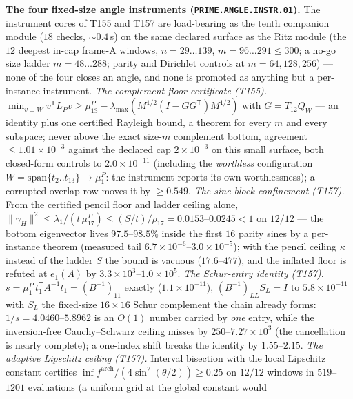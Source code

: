 \par\smallskip\noindent\textbf{The four fixed-size angle instruments
(\texttt{PRIME.ANGLE.INSTR.01}).}
The instrument cores of T155 and T157 are load-bearing as the tenth
companion module ($18$ checks, ${\sim}0.4$\,s) on the same declared
surface as the Ritz module (the $12$ deepest in-cap frame-A windows,
$n=29\ldots139$, $m=96\ldots291\le300$; a no-go size ladder
$m=48\ldots288$; parity and Dirichlet controls at $m=64,128,256$) ---
none of the four closes an angle, and none is promoted as anything but a
per-instance instrument.
\emph{The complement-floor certificate (T155).}
$\min_{v\perp W}v^{\mathsf T}L_Pv\ge\mu^P_{13}-\lambda_{\max}(M^{1/2}
(I-GG^{\mathsf T})M^{1/2})$ with $G=T_{12}Q_W$ --- an identity plus one
certified Rayleigh bound, a theorem for every $m$ and every subspace;
never above the exact size-$m$ complement bottom, agreement
$\le1.01\times10^{-3}$ against the declared cap $2\times10^{-3}$ on this
small surface, both closed-form controls to $2.0\times10^{-11}$
(including the \emph{worthless} configuration
$W=\mathrm{span}\{t_2..t_{13}\}\to\mu^P_1$: the instrument reports its
own worthlessness); a corrupted overlap row moves it by $\ge0.549$.
\emph{The sine-block confinement (T157).} From the certified pencil
floor and ladder ceiling alone,
$\|\gamma_H\|^2\le\lambda_1/(t\,\mu^P_{17})\le(S/t)/\rho_{17}
=0.0153$--$0.0245<1$ on $12/12$ --- the bottom eigenvector lives
$97.5$--$98.5\%$ inside the first $16$ parity sines by a per-instance
theorem (measured tail $6.7\times10^{-6}$--$3.0\times10^{-5}$); with the
pencil ceiling $\kappa$ instead of the ladder $S$ the bound is vacuous
($17.6$--$477$), and the inflated floor is refuted at $e_1(A)$ by
$3.3\times10^{3}$--$1.0\times10^{5}$.
\emph{The Schur-entry identity (T157).}
$s=\mu^P_1\,t_1^{\mathsf T}A^{-1}t_1=(B^{-1})_{11}$ exactly
($1.1\times10^{-11}$), $(B^{-1})_{LL}S_L=I$ to $5.8\times10^{-11}$ with
$S_L$ the fixed-size $16\times16$ Schur complement the chain already
forms: $1/s=4.0460$--$5.8962$ is an $O(1)$ number carried by \emph{one}
entry, while the inversion-free Cauchy--Schwarz ceiling misses by
$250$--$7.27\times10^{3}$ (the cancellation is nearly complete); a
one-index shift breaks the identity by $1.55$--$2.15$.
\emph{The adaptive Lipschitz ceiling (T157).} Interval bisection with
the local Lipschitz constant certifies
$\inf f^{\mathrm{arch}}/(4\sin^2(\theta/2))\ge0.25$ on $12/12$ windows in
$519$--$1201$ evaluations (a uniform grid at the global constant would
